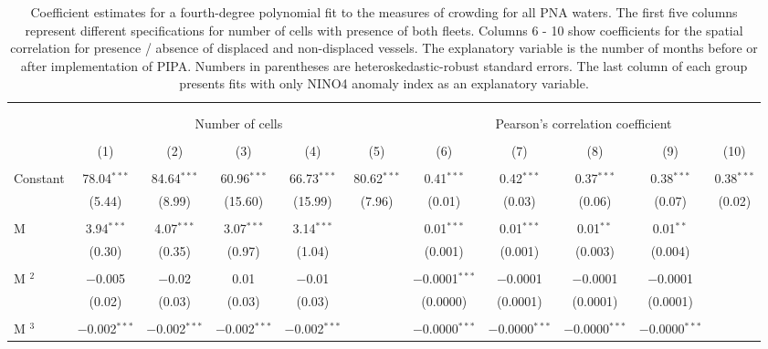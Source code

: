 
\begin{table}[H] \centering 
  \caption{\label{tab:sp_corr}Coefficient estimates for a fourth-degree polynomial fit to the measures of crowding for all PNA waters. The first five columns represent different specifications for number of cells with presence of both fleets. Columns 6 - 10 show coefficients for the spatial correlation for presence / absence of displaced and non-displaced vessels. The explanatory variable is the number of months before or after implementation of PIPA. Numbers in parentheses are heteroskedastic-robust standard errors. The last column of each group presents fits with only NINO4 anomaly index as an explanatory variable.} 
  \label{} 
\footnotesize 
\begin{tabular}{@{\extracolsep{0.1pt}}lcccccccccc} 
\\[-1.8ex]\hline 
\hline \\[-1.8ex] 
\\[-1.8ex] & \multicolumn{5}{c}{Number of cells} & \multicolumn{5}{c}{Pearson's correlation coefficient} \\ 
\\[-1.8ex] & (1) & (2) & (3) & (4) & (5) & (6) & (7) & (8) & (9) & (10)\\ 
\hline \\[-1.8ex] 
 Constant & 78.04$^{***}$ & 84.64$^{***}$ & 60.96$^{***}$ & 66.73$^{***}$ & 80.62$^{***}$ & 0.41$^{***}$ & 0.42$^{***}$ & 0.37$^{***}$ & 0.38$^{***}$ & 0.38$^{***}$ \\ 
  & (5.44) & (8.99) & (15.60) & (15.99) & (7.96) & (0.01) & (0.03) & (0.06) & (0.07) & (0.02) \\ 
  & & & & & & & & & & \\ 
 M & 3.94$^{***}$ & 4.07$^{***}$ & 3.07$^{***}$ & 3.14$^{***}$ &  & 0.01$^{***}$ & 0.01$^{***}$ & 0.01$^{**}$ & 0.01$^{**}$ &  \\ 
  & (0.30) & (0.35) & (0.97) & (1.04) &  & (0.001) & (0.001) & (0.003) & (0.004) &  \\ 
  & & & & & & & & & & \\ 
 M $^2$ & $-$0.005 & $-$0.02 & 0.01 & $-$0.01 &  & $-$0.0001$^{***}$ & $-$0.0001 & $-$0.0001 & $-$0.0001 &  \\ 
  & (0.02) & (0.03) & (0.03) & (0.03) &  & (0.0000) & (0.0001) & (0.0001) & (0.0001) &  \\ 
  & & & & & & & & & & \\ 
 M $^3$ & $-$0.002$^{***}$ & $-$0.002$^{***}$ & $-$0.002$^{***}$ & $-$0.002$^{***}$ &  & $-$0.0000$^{***}$ & $-$0.0000$^{***}$ & $-$0.0000$^{***}$ & $-$0.0000$^{***}$ &  \\ 

\end{tabular}
\end{table}
